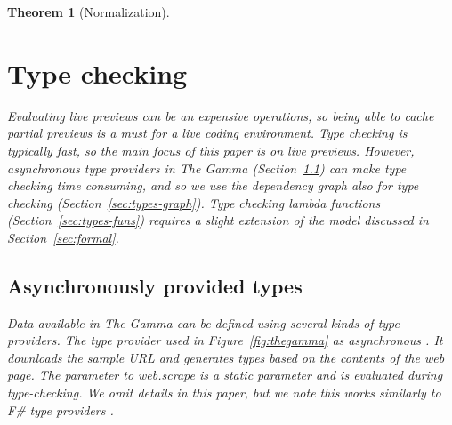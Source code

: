\documentclass[acmsmall,anonymous,fleqn]{acmart}\settopmatter{printfolios=false,printccs=false,printacmref=false}
\newcounter{thc}
\theoremstyle{plain}
\newtheorem{theorem}[thc]{Theorem}
\theoremstyle{definition}
\newcommand{\ident}[1]{\textnormal{\textcolor{idclr}{\sffamily #1}}}
\begin{document}
\begin{theorem}[Normalization]

\section{Type checking}
\label{sec:types}

Evaluating live previews can be an expensive operations, so being able to cache partial previews
is a must for a live coding environment. Type checking is typically fast, so the main focus of
this paper is on live previews. However, asynchronous type providers in The Gamma (Section~\ref{sec:types-providers})
can make type checking time consuming, and so we use the dependency graph also for type checking
(Section~\ref{sec:types-graph}). Type checking lambda functions (Section~\ref{sec:types-funs})
requires a slight extension of the model discussed in Section~\ref{sec:formal}.


\subsection{Asynchronously provided types}
\label{sec:types-providers}

Data available in The Gamma can be defined using several kinds of type providers. The type provider
used in Figure~\ref{fig:thegamma} as asynchronous \cite{async}. It downloads the sample URL and generates
types based on the contents of the web page. The parameter to \ident{web.scrape} is a static
parameter and is evaluated during type-checking. We omit details in this paper, but we note this
works similarly to F\# type providers \cite{providers-fsharp}.


\end{theorem}
\end{document}
